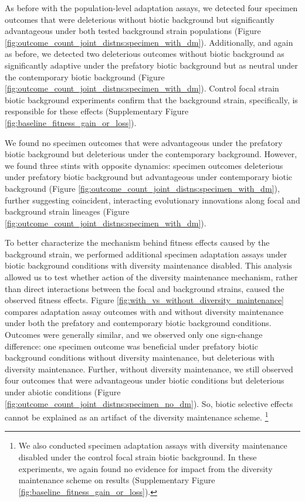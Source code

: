 As before with the population-level adaptation assays, we detected four specimen outcomes that were deleterious without biotic background but significantly advantageous under both tested background strain populations (Figure \ref{fig:outcome_count_joint_distns:specimen_with_dm}).
Additionally, and again as before, we detected two deleterious outcomes without biotic background as significantly adaptive under the prefatory biotic background but as neutral under the contemporary biotic background (Figure \ref{fig:outcome_count_joint_distns:specimen_with_dm}).
Control focal strain biotic background experiments confirm that the background strain, specifically, is responsible for these effects (Supplementary Figure \ref{fig:baseline_fitness_gain_or_loss}).

We found no specimen outcomes that were advantageous under the prefatory biotic background but deleterious under the contemporary background.
However, we found three stints with opposite dynamics: specimen outcomes deleterious under prefatory biotic background but advantageous under contemporary biotic background (Figure \ref{fig:outcome_count_joint_distns:specimen_with_dm}), further suggesting coincident, interacting evolutionary innovations along focal and background strain lineages (Figure \ref{fig:outcome_count_joint_distns:specimen_with_dm}).



To better characterize the mechanism behind fitness effects caused by the background strain, we performed additional specimen adaptation assays under biotic background conditions with diversity maintenance disabled.
This analysis allowed us to test whether action of the diversity maintenance mechanism, rather than direct interactions between the focal and background strains, caused the observed fitness effects.
Figure \ref{fig:with_vs_without_diversity_maintenance} compares adaptation assay outcomes with and without diversity maintenance under both the prefatory and contemporary biotic background conditions.
Outcomes were generally similar, and we observed only one sign-change difference: one specimen outcome was beneficial under prefatory biotic background conditions without diversity maintenance, but deleterious with diversity maintenance.
Further, without diversity maintenance, we still observed four outcomes that were advantageous under biotic conditions but deleterious under abiotic conditions (Figure \ref{fig:outcome_count_joint_distns:specimen_no_dm}).
So, biotic selective effects cannot be explained as an artifact of the diversity maintenance scheme.%
\footnote{
We also conducted specimen adaptation assays with diversity maintenance disabled under the control focal strain biotic background.
In these experiments, we again found no evidence for impact from the diversity maintenance scheme on results
(Supplementary Figure \ref{fig:baseline_fitness_gain_or_loss}).
}

